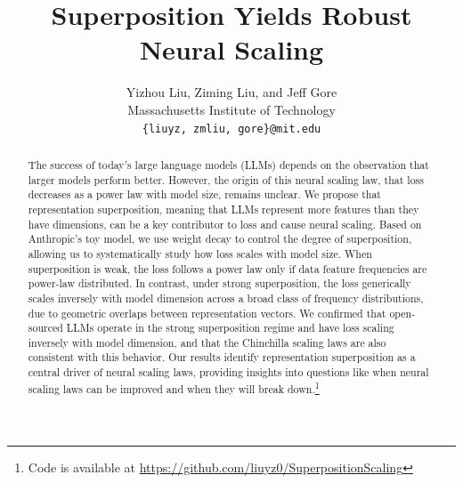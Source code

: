 \documentclass{article}
\title{Superposition Yields Robust Neural Scaling}
\author{%
  Yizhou Liu, Ziming Liu, and Jeff Gore \\
  Massachusetts Institute of Technology \\
  \texttt{\{liuyz, zmliu, gore\}@mit.edu}
}
\begin{document}
\maketitle
\begin{abstract}
  The success of today's large language models (LLMs) depends on the observation that larger models perform better. However, the origin of this neural scaling law, that loss decreases as a power law with model size, remains unclear. We propose that representation superposition, meaning that LLMs represent more features than they have dimensions, can be a key contributor to loss and cause neural scaling. Based on Anthropic's toy model, we use weight decay to control the degree of superposition, allowing us to systematically study how loss scales with model size. When superposition is weak, the loss follows a power law only if data feature frequencies are power-law distributed. In contrast, under strong superposition, the loss generically scales inversely with model dimension across a broad class of frequency distributions, due to geometric overlaps between representation vectors. We confirmed that open-sourced LLMs operate in the strong superposition regime and have loss scaling inversely with model dimension, and that the Chinchilla scaling laws are also consistent with this behavior. Our results identify representation superposition as a central driver of neural scaling laws, providing insights into questions like when neural scaling laws can be improved and when they will break down.\footnote{Code is available at \url{https://github.com/liuyz0/SuperpositionScaling}}
\end{abstract}
\end{document}
